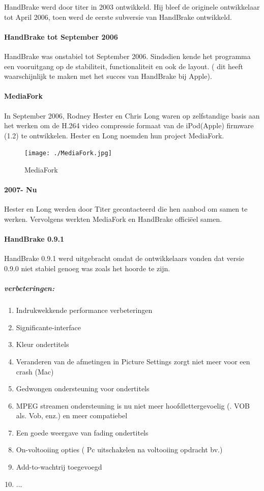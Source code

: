 \documentclass[12pt,a4paper]{article}
\begin{document}
\begin{titlepage}
\begin{center}
HandBrake werd door titer in 2003 ontwikkeld. Hij bleef de originele ontwikkelaar tot April 2006,  toen werd de eerste subversie van HandBrake ontwikkeld.

\paragraph{HandBrake tot September 2006} 
HandBrake was onstabiel tot September 2006. Sindsdien kende het programma een vooruitgang op de stabiliteit, functionaliteit en ook de layout. ( dit heeft waarschijnlijk te maken met het succes van HandBrake bij Apple). 

\paragraph{MediaFork}
In September 2006, Rodney Hester en Chris Long waren op zelfstandige basis aan het werken om de H.264 video compressie formaat van de iPod(Apple) firmware (1.2) te ontwikkelen. Hester en Long noemden hun project MediaFork.
\begin{figure}[h]
\begin{center}

\texttt{[image: ./MediaFork.jpg]}
\caption{\label{fig1}MediaFork}
\end{center}
\end{figure}

\paragraph{2007- Nu}
Hester en Long werden door Titer gecontacteerd die hen aanbod om samen te werken. Vervolgens werkten MediaFork en HandBrake officiëel samen.


\paragraph{HandBrake 0.9.1}
HandBrake 0.9.1 werd uitgebracht omdat de ontwikkelaars vonden dat versie 0.9.0 niet stabiel genoeg was zoals het hoorde te zijn.

\subparagraph{verbeteringen:}
\begin{enumerate}
\item Indrukwekkende performance verbeteringen
\item Significante-interface 
\item Kleur ondertitels 
\item Veranderen van de afmetingen in Picture Settings zorgt niet meer voor een crash (Mac)
\item Gedwongen ondersteuning voor ondertitels
\item MPEG streamen ondersteuning is nu niet meer hoofdlettergevoelig (. VOB als. Vob, enz.) en meer compatiebel
\item Een goede weergave van fading ondertitels
\item On-voltooiing opties ( Pc uitschakelen na voltooiing opdracht bv.)
\item Add-to-wachtrij toegevoegd
\item ...
\end{enumerate}
\pagebreak

\end{center}
\end{titlepage}
\end{document}
